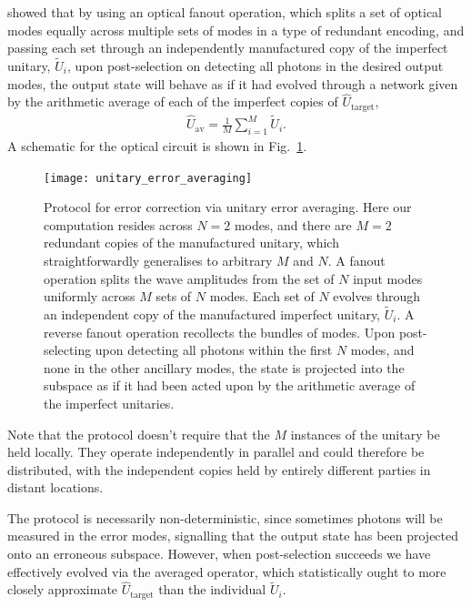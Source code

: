 \cite{MarshmanLundRohdeRalph} showed that by using an optical fanout operation, which splits a set of optical modes equally across multiple sets of modes in a type of redundant encoding, and passing each set through an independently manufactured copy of the imperfect unitary, $\tilde{U}_i$, upon post-selection on detecting all photons in the desired output modes, the output state will behave as if it had evolved through a network given by the arithmetic average of each of the imperfect copies of $\hat{U}_\text{target}$,
\begin{align}
\hat{U}_\text{av} = \frac{1}{M}\sum_{i=1}^M \tilde{U}_i.	
\end{align}
A schematic for the optical circuit is shown in Fig.~\ref{fig:error_av_circuit}.

\begin{figure}[!htb]
\texttt{[image: unitary\_error\_averaging]}
\caption{Protocol for error correction via unitary error averaging. Here our computation resides across \mbox{$N=2$} modes, and there are \mbox{$M=2$} redundant copies of the manufactured unitary, which straightforwardly generalises to arbitrary $M$ and $N$. A fanout operation splits the wave amplitudes from the set of $N$ input modes uniformly across $M$ sets of $N$ modes. Each set of $N$ evolves through an independent copy of the manufactured imperfect unitary, $\tilde{U}_i$. A reverse fanout operation recollects the bundles of modes. Upon post-selecting upon detecting all photons within the first $N$ modes, and none in the other ancillary modes, the state is projected into the subspace as if it had been acted upon by the arithmetic average of the imperfect unitaries.} \label{fig:error_av_circuit}	
\end{figure}

Note that the protocol doesn't require that the $M$ instances of the unitary be held locally. They operate independently in parallel and could therefore be distributed, with the independent copies held by entirely different parties in distant locations.

The protocol is necessarily non-deterministic, since sometimes photons will be measured in the error modes, signalling that the output state has been projected onto an erroneous subspace. However, when post-selection succeeds we have effectively evolved via the averaged operator, which statistically ought to more closely approximate $\hat{U}_\text{target}$ than the individual $\tilde{U}_i$.

